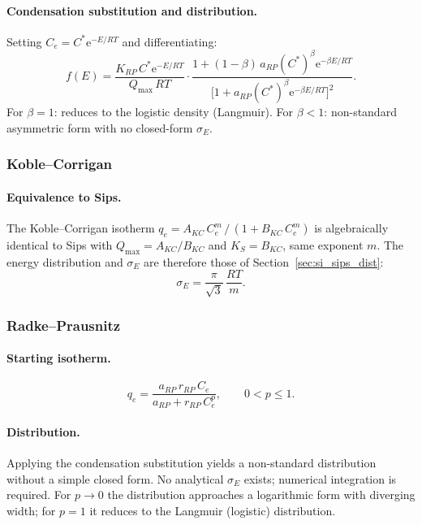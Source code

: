 \documentclass[journal=jacsat,manuscript=article]{achemso}
\begin{document}
\paragraph{Condensation substitution and distribution.}
Setting $C_e = C^{\ast}\mathrm{e}^{-E/RT}$ and differentiating:
\begin{equation}
	f(E) = \frac{K_{RP}\,C^{\ast}\mathrm{e}^{-E/RT}}{Q_{\max}\,RT}
	\cdot\frac{1+(1-\beta)\,a_{RP}(C^{\ast})^{\beta}\mathrm{e}^{-\beta E/RT}}
	          {\bigl[1+a_{RP}(C^{\ast})^{\beta}\mathrm{e}^{-\beta E/RT}\bigr]^{2}}.
	\label{eq:si_fE_RP}
\end{equation}
For $\beta = 1$: reduces to the logistic density (Langmuir). For $\beta < 1$:
non-standard asymmetric form with no closed-form $\sigma_E$.

\subsubsection{Koble--Corrigan}

\paragraph{Equivalence to Sips.}
The Koble--Corrigan isotherm
$q_e = A_{KC}\,C_e^{m}\,/\,(1 + B_{KC}\,C_e^{m})$
is algebraically identical to Sips with $Q_{\max} = A_{KC}/B_{KC}$ and
$K_S = B_{KC}$, same exponent $m$.
The energy distribution and $\sigma_E$ are therefore those of
Section~\ref{sec:si_sips_dist}:
\begin{equation}
	\sigma_E = \frac{\pi}{\sqrt{3}}\,\frac{RT}{m}.
\end{equation}

\subsubsection{Radke--Prausnitz}

\paragraph{Starting isotherm.}
\begin{equation}
	q_e = \frac{a_{RP}\,r_{RP}\,C_e}{a_{RP} + r_{RP}\,C_e^{p}},
	\qquad 0 < p \leq 1.
\end{equation}

\paragraph{Distribution.}
Applying the condensation substitution yields a non-standard distribution
without a simple closed form. No analytical $\sigma_E$ exists; numerical
integration is required. For $p \to 0$ the distribution approaches a
logarithmic form with diverging width; for $p = 1$ it reduces to the
Langmuir (logistic) distribution.
\end{document}
